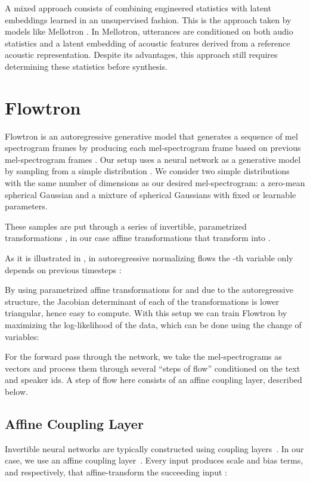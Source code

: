 \documentclass{article}
\begin{document}
A mixed approach consists of combining engineered statistics with latent embeddings learned in an unsupervised fashion. This is the approach taken by models like Mellotron \cite{valle2019mellotron}. In Mellotron, utterances are conditioned on both audio statistics and a latent embedding of acoustic features derived from a reference acoustic representation. Despite its advantages, this approach still requires determining these statistics before synthesis. \section{Flowtron}\label{sec:audio_flow}
Flowtron is an autoregressive generative model that generates a sequence of mel spectrogram frames  by producing each mel-spectrogram frame based on previous mel-spectrogram frames . Our setup uses a neural network as a generative model by sampling from a simple distribution . We consider two simple distributions with the same number of dimensions as our desired mel-spectrogram: a zero-mean spherical Gaussian and a mixture of spherical Gaussians with fixed or learnable parameters.



These samples are put through a series of invertible, parametrized transformations , in our case affine transformations that transform  into .


As it is illustrated in \cite{kingma2016improved}, in autoregressive normalizing flows the -th variable  only depends on previous timesteps :


By using parametrized affine transformations for  and due to the autoregressive structure, the Jacobian determinant of each of the transformations  is lower triangular, hence easy to compute. With this setup we can train Flowtron by maximizing the log-likelihood of the data, which can be done using the change of variables:


For the forward pass through the network, we take the mel-spectrograms as vectors and process them through several ``steps of flow” conditioned on the text and speaker ids. A step of flow here consists of an affine coupling layer, described below.

\subsection{Affine Coupling Layer}
Invertible neural networks are typically constructed using coupling layers~\cite{dinh2014nice, dinh2016density, kingma2018glow}.  In our case, we use an affine coupling layer~\cite{dinh2016density}. Every input  produces scale and bias terms,  and  respectively, that affine-transform the succeeding input :  
\end{document}
